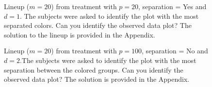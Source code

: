 \begin{figure}[hbtp]
   \centering
       \caption{Lineup  ($m=20$) from treatment with $p = 20$, separation = Yes and $d = 1$. The subjects were asked to identify the plot with the most separated colors. Can you identify the observed data plot? The solution to the lineup is provided in the Appendix. }
     \label{fig:test_category_1d}
\end{figure}


 
\begin{figure}[hbtp]
       \caption{Lineup  ($m=20$) from treatment with $p = 100$, separation = No and $d = 2$.The subjects were asked to identify the plot with the most separation between the colored groups. Can you identify the observed data plot? The solution is provided in the Appendix. }
       \label{fig:test_category}
\end{figure}

